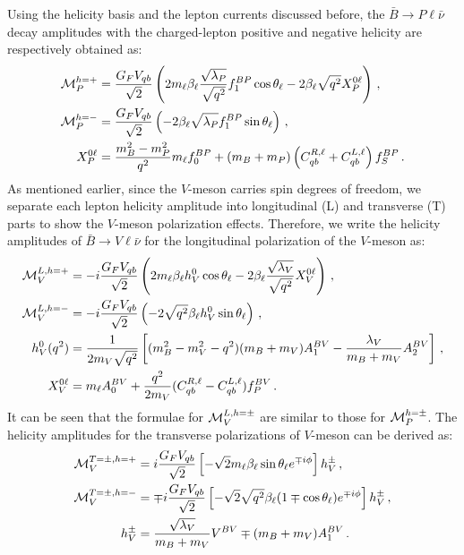 \documentclass[prd,preprint,superscriptaddress,amsmath,amssymb]{revtex4}
\begin{document}
 Using the helicity basis and the lepton currents discussed before,  the $\bar B \to P \ell \bar\nu$ decay amplitudes with  the charged-lepton positive and negative helicity are respectively obtained as:
 \begin{align}
 {\cal M}^{ h=+}_{P} & = \frac{G_F V_{qb}}{\sqrt{2}} 
 \left( 2 m_\ell \beta_\ell \frac{\sqrt{\lambda_{P}}}{\sqrt{q^2}} f^{BP}_1 \cos\theta_\ell - 2\beta_\ell \sqrt{q^2} X^{0\ell}_{P}\right)\,, \\
%
 {\cal M}^{h=-}_{P} & = \frac{G_F V_{qb}}{\sqrt{2}} \left( -2  \beta_{\ell}  \sqrt{\lambda_{P}} f^{BP}_1 \sin\theta_\ell \right)
\,, \\
 X^{0\ell}_P & =  \frac{m^2_B - m^2_P}{q^2}  m_\ell f^{BP}_0 + (m_B + m_P) \left( C^{R,\ell}_{qb} + C^{L,\ell}_{qb}\right) f^{BP}_S \,. \label{eq:X0P}
 \end{align}
As mentioned earlier, since the $V$-meson  carries spin degrees of freedom, we separate each lepton helicity amplitude into longitudinal (L) and transverse (T) parts to show  the $V$-meson polarization effects. Therefore, we write the helicity amplitudes of $\bar B\to V \ell \bar\nu$ for the longitudinal polarization of the $V$-meson as:
%
\begin{align}
{\cal M}^{L,h=+}_{V} & = -i\frac{G_F V_{qb}}{\sqrt{2}} \left(2 m_\ell \beta_\ell h^0_{V} \cos\theta_\ell - 2 \beta_\ell \frac{\sqrt{\lambda_{V}}}{ \sqrt{q^2} } X^{0\ell}_{V}\right) \,, \label{eq:ALV}\\
%
{\cal M}^{L,h=-}_{V} & =-i\frac{G_F V_{qb}}{\sqrt{2}} \left( -2\sqrt{q^2} \beta_\ell  h^0_{V} \sin\theta_\ell \right) \,, \\
%
 h^0_{V}(q^2) &= \frac{ 1}{2 m_{V} \sqrt{q^2}}\left[(m_B^2-m_{V}^2-q^2)(m_B+m_{V})A^{BV}_1-
\frac{{\lambda_{V} }}{m_B+m_{V}}A^{BV}_2\right]\,, \nonumber \\
%
X^{0\ell}_{V} & = m_\ell A^{BV}_0 + \frac{q^2}{2m_V } (C^{R,\ell}_{qb} - C^{L,\ell}_{qb}) f^{BV}_P\,.  \label{eq:X0V}
\end{align}
It can be seen that the formulae for ${\cal M}^{L,h=\pm}_{V}$ are similar to those for ${\cal M}^{ h=\pm}_{P}$. The helicity  amplitudes for the transverse polarizations of $V$-meson can be derived as:
\begin{align}
{\cal M}^{T=\pm, h=+}_{V} &= i\frac{G_F V_{qb}}{\sqrt{2}}  \left[-\sqrt{2} m_{\ell} \beta_{\ell}  \sin\theta_\ell e^{\mp i \phi} \right]  h^{\pm}_{V} \,, \\
%
{\cal M}^{T=\pm, h=-}_{V} &= \mp i \frac{G_F V_{qb}}{\sqrt{2}}  \left[-\sqrt{2} \sqrt{q^2} \beta_\ell (1\mp \cos\theta_\ell)  e^{\mp i \phi} \right]h^{\pm}_{V} \,, \\
%
h^{\pm}_{V} & = \frac{\sqrt{\lambda_{V}} }{m_B + m_{V}} V^{BV} \mp (m_B + m_{V} ) A^{BV}_1\,. \nonumber
% 
\end{align}
\end{document}
